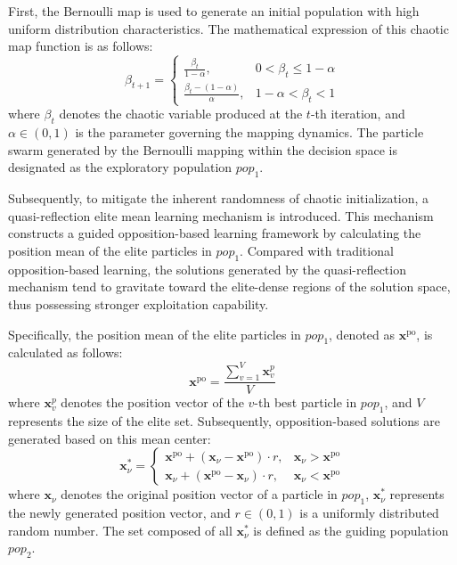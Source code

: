 \documentclass[lettersize,journal]{IEEEtran}
\begin{document}
First, the Bernoulli map is used to generate an initial population with high uniform distribution characteristics. The mathematical expression of this chaotic map function is as follows:
\begin{equation} 
    \beta_{t+1}=\begin{cases}
        \frac{\beta_t}{1-\alpha},&0<\beta_t\leq1-\alpha\\
        \frac{\beta_t-(1-\alpha)}\alpha,&1-\alpha<\beta_t<1
    \end{cases} 
    \label{eq:bernoulli_calculation} 
\end{equation}
where $\beta_t$ denotes the chaotic variable produced at the $t$-th iteration, and $\alpha \in (0,1)$ is the parameter governing the mapping dynamics. The particle swarm generated by the Bernoulli mapping within the decision space is designated as the exploratory population $pop_1$.

Subsequently, to mitigate the inherent randomness of chaotic initialization, a quasi-reflection elite mean learning mechanism is introduced. This mechanism constructs a guided opposition-based learning framework by calculating the position mean of the elite particles in $pop_1$. Compared with traditional opposition-based learning, the solutions generated by the quasi-reflection mechanism tend to gravitate toward the elite-dense regions of the solution space, thus possessing stronger exploitation capability.

Specifically, the position mean of the elite particles in $pop_1$, denoted as $\boldsymbol{x}^{\mathrm{po}}$, is calculated as follows:
\begin{equation}
    \boldsymbol{x}^{\mathrm{po}}=\frac{\sum_{v=1}^{V} \boldsymbol{x}_{v}^{p}}{V}
\end{equation}
where $\boldsymbol{x}_{v}^{p}$ denotes the position vector of the $v$-th best particle in $pop_1$, and $V$ represents the size of the elite set. Subsequently, opposition-based solutions are generated based on this mean center:
\begin{equation}
    \boldsymbol{x}_\nu^* = \begin{cases} 
        \boldsymbol{x}^\mathrm{po} + (\boldsymbol{x}_\nu - \boldsymbol{x}^\mathrm{po}) \cdot r, & \boldsymbol{x}_\nu > \boldsymbol{x}^\mathrm{po} \\
        \boldsymbol{x}_\nu + (\boldsymbol{x}^\mathrm{po} - \boldsymbol{x}_\nu) \cdot r, & \boldsymbol{x}_\nu < \boldsymbol{x}^\mathrm{po} 
    \end{cases}
    \label{eq:Quasi-reflective_elite_mean_learning_mechanism}
\end{equation}
where $\boldsymbol{x}_\nu$ denotes the original position vector of a particle in $pop_1$, $\boldsymbol{x}_\nu^*$ represents the newly generated position vector, and $r \in (0,1)$ is a uniformly distributed random number. The set composed of all $\boldsymbol{x}_\nu^*$ is defined as the guiding population $pop_2$.
\end{document}
